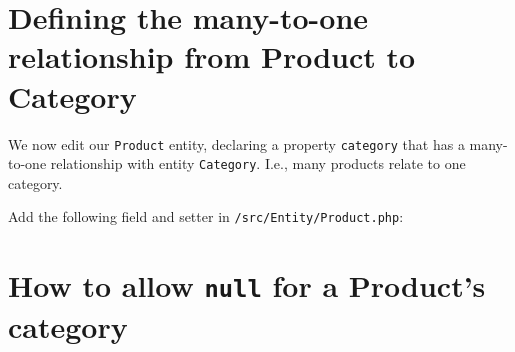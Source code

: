 \documentclass[a4paperpaper,openright]{book}
\newenvironment{Shaded}{}{}
\newcommand{\AnnotationTok}[1]{\textcolor[rgb]{0.38,0.63,0.69}{\textbf{\textit{#1}}}}
\newcommand{\CommentTok}[1]{\textcolor[rgb]{0.38,0.63,0.69}{\textit{#1}}}
\newcommand{\KeywordTok}[1]{\textcolor[rgb]{0.00,0.44,0.13}{\textbf{#1}}}
\newcommand{\NormalTok}[1]{#1}
\newcommand{\OtherTok}[1]{\textcolor[rgb]{0.00,0.44,0.13}{#1}}
\newcommand{\StringTok}[1]{\textcolor[rgb]{0.25,0.44,0.63}{#1}}
\begin{document}
\hypertarget{defining-the-many-to-one-relationship-from-product-to-category}{%
\section{Defining the many-to-one relationship from Product to
Category}\label{defining-the-many-to-one-relationship-from-product-to-category}}

We now edit our \texttt{Product} entity, declaring a property
\texttt{category} that has a many-to-one relationship with entity
\texttt{Category}. I.e., many products relate to one category.

Add the following field and setter in \texttt{/src/Entity/Product.php}:

\begin{Shaded}
\end{Shaded}

\hypertarget{how-to-allow-null-for-a-products-category}{%
\section{\texorpdfstring{How to allow \texttt{null} for a Product's
category}{How to allow null for a Product's category}}\label{how-to-allow-null-for-a-products-category}}
\end{document}
